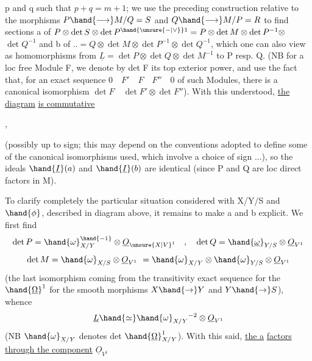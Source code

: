 
p and q such that $p+q=m+1$; we use the preceding construction relative
to the morphisms $P\hand{\longrightarrow} M/Q = S$ and $Q\hand{\longrightarrow} M/P = R$ to find
sections  a of $P \otimes \det S \otimes \det P^{\hand{\unsure{-|\vee}}1} = P \otimes \det M \otimes \det P^{-1} \otimes$
$\det Q^{-1}$ and b of $.. = Q \otimes \det M \otimes \det P^{-1} \otimes \det Q^{-1}$, which one can
also view as homomorphisms from $\underline{L} = \det P \otimes \det Q \otimes \det M^{-1}$
to P resp. Q. (NB for a loc free Module F, we denote by det F
its top exterior power, and use the fact that, for an exact
sequence $0 \quad F' \quad F \quad F'' \quad 0$ of such Modules, there is a canonical
isomorphism $\det F \quad \det F' \otimes \det F''$). With this understood, \uline{the diagram}
\uline{is commutative}

,

(possibly up to sign; this may depend on the conventions
adopted to define some of the canonical isomorphisms used,
which involve a choice of sign ...), so the ideals $\hand{\underline{I}}(a)$ and $\hand{\underline{I}}(b)$
are identical (since P and Q are loc direct factors in M). 

To clarify completely the particular situation
considered with X/Y/S and $\hand{\phi}$, described in diagram  above, 
it remains to make a and b explicit. We first find
\[ \det P = \hand{\omega}_{X/Y}^{\hand{-1}} \otimes \underline{O}_{\unsure{X|V}^{1}} \quad , \quad \det Q = \hand{\underline{\omega}}_{Y/S} \otimes \underline{O}_{V^{1}} \]
\[ \det M = \hand{\omega}_{X/S} \otimes \underline{O}_{V^{1}} \ = \hand{\omega}_{X/Y} \otimes \hand{\omega}_{Y/S} \otimes \underline{O}_{V^{1}} \]
(the last isomorphism coming from the transitivity exact sequence
for the $\hand{\underline{\Omega}}^1$ for the smooth morphisms $X\hand{\to}Y$ and $Y\hand{\to}S$), whence
\[ \underline{L} \hand{\simeq} \hand{\omega}_{X/Y}{}^{-2} \otimes \underline{O}_{V^{1}} \]
(NB $\hand{\omega}_{X/Y}$ denotes  det $\hand{\underline{\Omega}}^1_{X/Y}$). With this said, \uline{the } \uline{a}
\uline{factors through the component} $\underline{O}_{V^{1}}$

